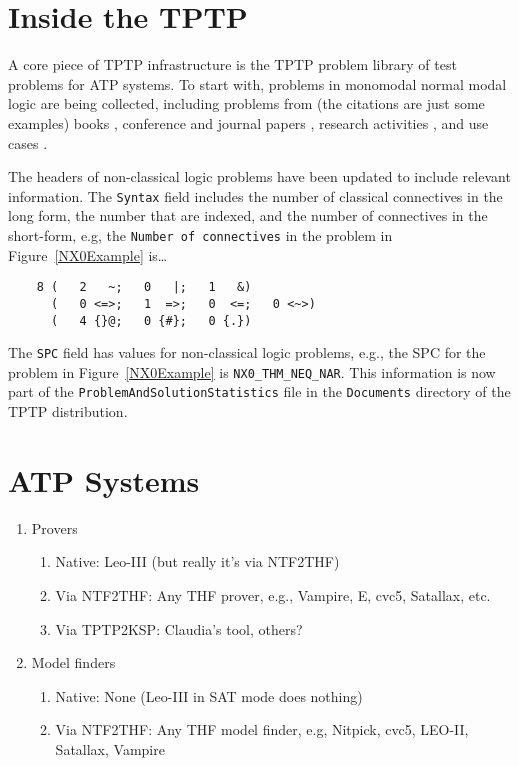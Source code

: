 \documentclass[runningheads]{llncs}
\begin{document}
\section{Inside the TPTP}
\label{InsideTPTP}

A core piece of TPTP infrastructure is the TPTP problem library of test problems for
ATP systems.
To start with, problems in monomodal normal modal logic are being collected, including problems 
from (the citations are just some examples)
books \cite{For94,FM98,Gir00,Sid10}, 
conference and journal papers \cite{Rei92,FH+98,Sto00,PN+21}, 
research activities \cite{RP+07}, 
and use cases \cite{BW14-ECAI,MR22}.

The headers of non-classical logic problems have been updated to include relevant information.
The {\tt Syntax} field includes the number of classical connectives in the long form, the 
number that are indexed, and the number of connectives in the short-form, e.g,
the {\tt Number of connectives} in the problem in Figure~\ref{NX0Example} is\ldots
\begin{verbatim}
    8 (   2   ~;   0   |;   1   &)
      (   0 <=>;   1  =>;   0  <=;   0 <~>)
      (   4 {}@;   0 {#};   0 {.})
\end{verbatim}
The {\tt SPC} field has values for non-classical logic problems, e.g., the SPC for the problem 
in Figure~\ref{NX0Example} is {\tt NX0\_THM\_NEQ\_NAR}.
This information is now part of the {\tt ProblemAndSolutionStatistics} file in the {\tt Documents}
directory of the TPTP distribution.

\section{ATP Systems}
\label{ATPSystems}

      \begin{enumerate}
      \item Provers
            \begin{enumerate}
            \item  Native: Leo-III (but really it's via NTF2THF)
            \item Via NTF2THF: Any THF prover, e.g., Vampire, E, cvc5, Satallax, etc.
            \item Via TPTP2KSP: Claudia's tool, others?
            \end{enumerate}
      \item Model finders
            \begin{enumerate}
            \item Native: None (Leo-III in SAT mode does nothing)
            \item Via NTF2THF: Any THF model finder, e.g, Nitpick, cvc5, LEO-II, Satallax, Vampire
            \end{enumerate}
      \end{enumerate}
\end{document}
